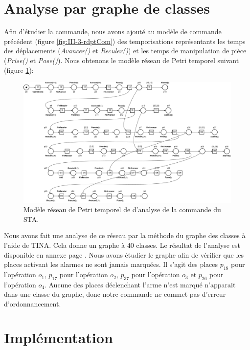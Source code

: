 \section{Analyse par graphe de classes}
Afin d'étudier la commande, nous avons ajouté au modèle de commande précédent (figure \ref{fig:III-3-rdptCom}) des temporisations représentants les temps des déplacements (\emph{Avancer()} et \emph{Reculer()}) et les temps de manipulation de pièce (\emph{Prise()} et \emph{Pose()}). Nous obtenons le modèle réseau de Petri temporel suivant (figure \ref{fig:III-3-rdptAnalyse}):
\begin{figure}[!ht]
\centering
\includegraphics[width=\textwidth]{./III/images/reseau_Commande--III-3.pdf}
\caption{\label{fig:III-3-rdptAnalyse}Modèle réseau de Petri temporel de d'analyse de la commande du STA.}
\end{figure}

Nous avons fait une analyse de ce réseau par la méthode du graphe des classes à l'aide de TINA. Cela donne un graphe à 40 classes. Le résultat de l'analyse est disponible en annexe page \pageref{Annex:III}. Nous avons étudier le graphe afin de vérifier que les places activant les alarmes ne sont jamais marquées. Il s'agit des places $p_18$ pour l'opération $o_1$, $p_17$ pour l'opération $o_2$, $p_37$ pour l'opération $o_3$ et $p_26$ pour l'opération $o_4$. Aucune des places déclenchant l'arme n'est marqué n'apparait dans une classe du graphe, donc notre commande ne commet pas d'erreur d'ordonnancement.



\section{Implémentation}